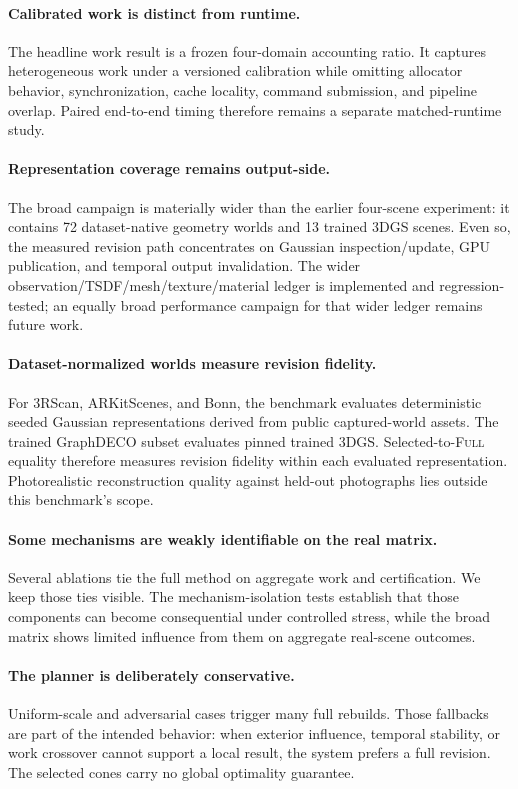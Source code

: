 \documentclass[acmtog,nonacm]{acmart}
\newcommand{\FULL}{\textsc{Full}}
\begin{document}
\paragraph{Calibrated work is distinct from runtime.}
The headline work result is a frozen four-domain accounting ratio. It captures heterogeneous work under a versioned calibration while omitting allocator behavior, synchronization, cache locality, command submission, and pipeline overlap. Paired end-to-end timing therefore remains a separate matched-runtime study.

\paragraph{Representation coverage remains output-side.}
The broad campaign is materially wider than the earlier four-scene experiment: it contains 72 dataset-native geometry worlds and 13 trained 3DGS scenes. Even so, the measured revision path concentrates on Gaussian inspection/update, GPU publication, and temporal output invalidation. The wider observation/TSDF/mesh/texture/material ledger is implemented and regression-tested; an equally broad performance campaign for that wider ledger remains future work.

\paragraph{Dataset-normalized worlds measure revision fidelity.}
For 3RScan, ARKitScenes, and Bonn, the benchmark evaluates deterministic seeded Gaussian representations derived from public captured-world assets. The trained GraphDECO subset evaluates pinned trained 3DGS. Selected-to-\FULL{} equality therefore measures revision fidelity within each evaluated representation. Photorealistic reconstruction quality against held-out photographs lies outside this benchmark's scope.

\paragraph{Some mechanisms are weakly identifiable on the real matrix.}
Several ablations tie the full method on aggregate work and certification. We keep those ties visible. The mechanism-isolation tests establish that those components can become consequential under controlled stress, while the broad matrix shows limited influence from them on aggregate real-scene outcomes.

\paragraph{The planner is deliberately conservative.}
Uniform-scale and adversarial cases trigger many full rebuilds. Those fallbacks are part of the intended behavior: when exterior influence, temporal stability, or work crossover cannot support a local result, the system prefers a full revision. The selected cones carry no global optimality guarantee.
\end{document}
